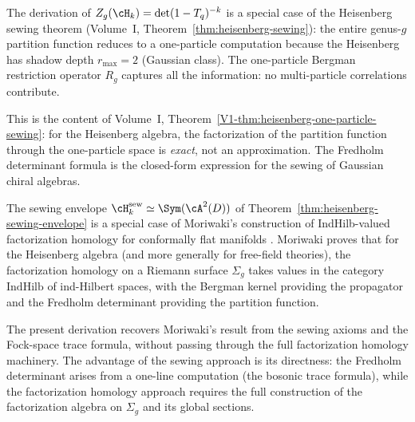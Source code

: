 \begin{remark}
The derivation of $Z_g(\cH_k) = \det(1-T_q)^{-k}$ is a special
case of the Heisenberg sewing theorem
(Volume~I, Theorem~\ref*{thm:heisenberg-sewing}): the entire
genus-$g$ partition function reduces to a one-particle computation
because the Heisenberg has shadow depth $r_{\max} = 2$ (Gaussian
class). The one-particle Bergman restriction operator $R_g$ captures
all the information: no multi-particle correlations contribute.

This is the content of Volume~I,
Theorem~\ref*{V1-thm:heisenberg-one-particle-sewing}: for the
Heisenberg algebra, the factorization of the partition function
through the one-particle space is \emph{exact}, not an
approximation. The Fredholm determinant formula is the closed-form
expression for the sewing of Gaussian chiral algebras.
\end{remark}

\begin{remark}
The sewing envelope $\cH_k^{\mathrm{sew}} \simeq \Sym(\cA^2(D))$
of Theorem~\ref{thm:heisenberg-sewing-envelope} is a special case
of Moriwaki's construction of IndHilb-valued factorization homology
for conformally flat manifolds \cite{Moriwaki26a}. Moriwaki proves that
for the Heisenberg algebra (and more generally for free-field
theories), the factorization homology on a Riemann surface $\Sigma_g$
takes values in the category $\mathrm{IndHilb}$ of ind-Hilbert
spaces, with the Bergman kernel providing the propagator and the
Fredholm determinant providing the partition function.

The present derivation recovers Moriwaki's result from the sewing
axioms and the Fock-space trace formula, without passing through
the full factorization homology machinery. The advantage of the
sewing approach is its directness: the Fredholm determinant arises
from a one-line computation (the bosonic trace formula), while the
factorization homology approach requires the full construction of
the factorization algebra on $\Sigma_g$ and its global sections.
\end{remark}

